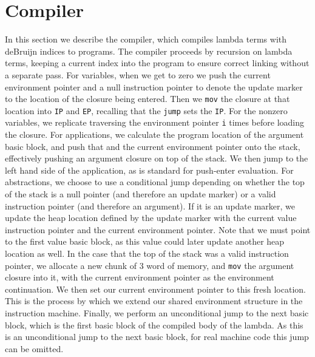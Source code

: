 \section{Compiler} \label{sec:compiler}

In this section we describe the compiler, which compiles lambda terms with
deBruijn indices to programs. The compiler proceeds by recursion on lambda
terms, keeping a current index into the program to ensure correct linking
without a separate pass. For variables, when we get to zero we push the current
environment pointer and a null instruction pointer to denote the update marker
to the location of the closure being entered. Then we \texttt{mov} the closure
at that location into \texttt{IP} and \texttt{EP}, recalling that the
\texttt{jump} sets the \texttt{IP}. For the nonzero variables, we replicate
traversing the environment pointer \texttt{i} times before loading the closure.
For applications, we calculate the program location of the argument basic block,
and push that and the current environment pointer onto the stack, effectively
pushing an argument closure on top of the stack. We then jump to the left hand
side of the application, as is standard for push-enter evaluation. For
abstractions, we choose to use a conditional jump depending on whether the top
of the stack is a null pointer (and therefore an update marker) or a valid
instruction pointer (and therefore an argument). If it is an update marker, we
update the heap location defined by the update marker with the current value
instruction pointer and the current environment pointer.  Note that we must
point to the first value basic block, as this value could later update another
heap location as well. In the case that the top of the stack was a valid
instruction pointer, we allocate a new chunk of 3 word of memory, and
\texttt{mov} the argument closure into it, with the current environment pointer
as the environment continuation. We then set our current environment pointer to
this fresh location. This is the process by which we extend our shared
environment structure in the instruction machine. Finally, we perform an
unconditional jump to the next basic block, which is the first basic block of
the compiled body of the lambda. As this is an unconditional jump to the next
basic block, for real machine code this jump can be omitted. 

